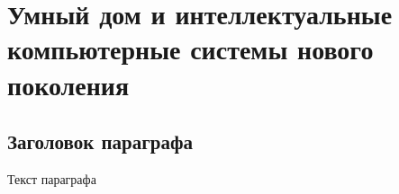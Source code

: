 
\chapter{Умный дом и интеллектуальные компьютерные системы нового поколения}
\label{chapter_smart_home}


\section{Заголовок параграфа}
Текст параграфа

%
